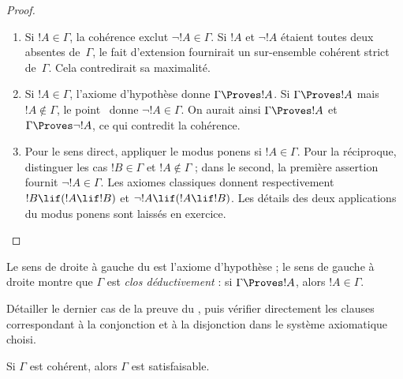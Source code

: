 \documentclass[../../../include/open-logic-section]{subfiles}
\begin{document}
\begin{proof}
\begin{enumerate}
\item Si $!A\in\Gamma$, la cohérence exclut
  $\lnot !A\in\Gamma$. Si $!A$ et $\lnot !A$
  étaient toutes deux absentes de~$\Gamma$, le fait
  d'extension fournirait un sur-ensemble cohérent
  strict de~$\Gamma$. Cela contredirait sa maximalité.
\item Si $!A\in\Gamma$, l'axiome d'hypothèse donne
  $\Gamma\Proves !A$. Si $\Gamma\Proves !A$
  mais $!A\notin\Gamma$, le point~
  donne $\lnot !A\in\Gamma$. On aurait ainsi
  $\Gamma\Proves !A$ et
  $\Gamma\Proves\lnot !A$, ce qui contredit
  la cohérence.
\item Pour le sens direct, appliquer le modus ponens
  si $!A\in\Gamma$. Pour la réciproque, distinguer
  les cas $!B\in\Gamma$ et $!A\notin\Gamma$ ;
  dans le second, la première assertion fournit
  $\lnot !A\in\Gamma$. Les axiomes classiques
  donnent respectivement
  $!B\lif(!A\lif !B)$ et
  $\lnot !A\lif(!A\lif !B)$.
  Les détails des deux applications du modus ponens
  sont laissés en exercice.
\end{enumerate}
\end{proof}

Le sens de droite à gauche du
est l'axiome d'hypothèse ; le sens de gauche à droite
montre que $\Gamma$ est \emph{clos déductivement} :
si $\Gamma\Proves !A$, alors $!A\in\Gamma$.

\begin{prob}
  Détailler le dernier cas de la preuve du
  , puis vérifier directement
  les clauses correspondant à la conjonction et
  à la disjonction dans le système axiomatique choisi.
\end{prob}

\begin{thm}[Complétude]
Si $\Gamma$ est cohérent, alors $\Gamma$ est satisfaisable.
\end{thm}
\end{document}
